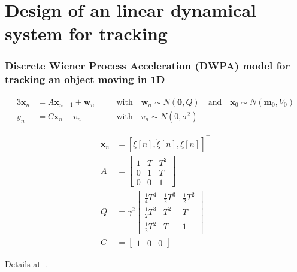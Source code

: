 \section{Design of an linear dynamical system for tracking}

\begin{frame}
    \frametitle{Discrete Wiener Process Acceleration (DWPA) model for tracking
    an object moving in 1D}

    \small

    \begin{alignat*}{3}
        \mathbf{x}_n &= A\mathbf{x}_{n-1} + \mathbf{w}_n && \quad \text{with} \quad\mathbf{w}_n\sim N(\mathbf{0}, Q) \quad \text{and} \quad\mathbf{x}_0\sim N(\mathbf{m}_0, V_0)\\
        y_n &= C\mathbf{x}_{n} + v_n                     && \quad \text{with} \quad v_n\sim N(0, \sigma^2)
    \end{alignat*}

    \begin{align*}
        \mathbf{x}_n&=\left[\xi[n],\dot{\xi}[n],\ddot{\xi}[n]\right]^\intercal\\
        A&=\begin{bmatrix}
            1 & T & T^2\\
            0 & 1 & T\\
            0 & 0 & 1
        \end{bmatrix}\\
        Q&=\gamma^2\begin{bmatrix}
            \frac{1}{4}T^4&\frac{1}{2}T^3&\frac{1}{2}T^2\\
            \frac{1}{2}T^3&T^2&T\\
            \frac{1}{2}T^2&T&1
        \end{bmatrix}\\
        C&=\begin{bmatrix}
            1 & 0 &0
        \end{bmatrix}
    \end{align*}
    \vspace{-1.0cm}
    \par
    \hfill\tiny Details at~\citet{rapela26}.
    \normalsize

\end{frame}


